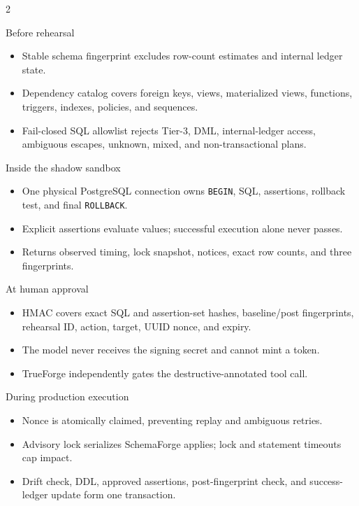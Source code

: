 \documentclass[10pt]{article}
\begin{document}
\begin{multicols}{2}
\begin{card}{Before rehearsal}
\begin{itemize}
  \item Stable schema fingerprint excludes row-count estimates and internal ledger state.
  \item Dependency catalog covers foreign keys, views, materialized views, functions, triggers, indexes, policies, and sequences.
  \item Fail-closed SQL allowlist rejects Tier-3, DML, internal-ledger access, ambiguous escapes, unknown, mixed, and non-transactional plans.
\end{itemize}
\end{card}

\begin{card}{Inside the shadow sandbox}
\begin{itemize}
  \item One physical PostgreSQL connection owns \texttt{BEGIN}, SQL, assertions, rollback test, and final \texttt{ROLLBACK}.
  \item Explicit assertions evaluate values; successful execution alone never passes.
  \item Returns observed timing, lock snapshot, notices, exact row counts, and three fingerprints.
\end{itemize}
\end{card}

\begin{card}{At human approval}
\begin{itemize}
  \item HMAC covers exact SQL and assertion-set hashes, baseline/post fingerprints, rehearsal ID, action, target, UUID nonce, and expiry.
  \item The model never receives the signing secret and cannot mint a token.
  \item TrueForge independently gates the destructive-annotated tool call.
\end{itemize}
\end{card}

\begin{card}{During production execution}
\begin{itemize}
  \item Nonce is atomically claimed, preventing replay and ambiguous retries.
  \item Advisory lock serializes SchemaForge applies; lock and statement timeouts cap impact.
  \item Drift check, DDL, approved assertions, post-fingerprint check, and success-ledger update form one transaction.
\end{itemize}
\end{card}
\end{multicols}
\end{document}
